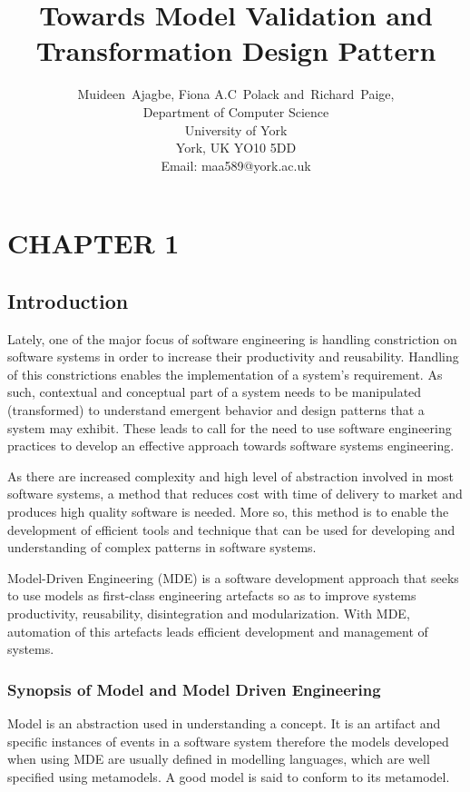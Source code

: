 \documentclass[10pt]{article}
\begin{document}
\title{Towards Model Validation and Transformation Design Pattern}
\author{Muideen~Ajagbe,
        Fiona A.C~Polack
        and~Richard~Paige,\\
Department of Computer Science\\
University of York\\
York, UK YO10 5DD\\
Email: maa589@york.ac.uk}
\date{\vspace{-5ex}}
\maketitle

\chapter{CHAPTER 1}
\section{Introduction}
Lately, one of the major focus of software engineering is handling constriction on software systems in order to increase their productivity and reusability. Handling of this constrictions enables the implementation of a system’s requirement. As such, contextual and conceptual part of a system needs to be manipulated (transformed) to understand emergent behavior and design patterns that a system may exhibit. These leads to call for the need to use software engineering practices to develop an effective approach towards software systems engineering.

As there are increased complexity and high level of abstraction involved in most software systems, a method that reduces cost with time of delivery to market and produces high quality software is needed. More so, this method is to enable the development of efficient tools and technique that can be used for developing and understanding of complex patterns in software systems.

Model-Driven Engineering (MDE) is a software development approach that seeks to use models as first-class engineering artefacts so as to improve systems productivity, reusability, disintegration and modularization. With MDE, automation of this artefacts leads efficient development and management of systems.

\subsection{Synopsis of Model and Model Driven Engineering}
Model is an abstraction used in understanding a concept. It is an artifact and specific instances of events in a software system therefore the models developed when using MDE are usually defined in modelling languages, which are well specified using metamodels.  A good model is said to conform to its metamodel.
\end{document}
